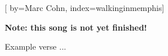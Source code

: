 
[%
    by={Marc Cohn},
    index={walkinginmemphis}]


    \label{walkinginmemphis}

    \textbf{Note: this song is not yet finished!}

    \beginverse
        Example verse ...
    \endverse
\endsong
